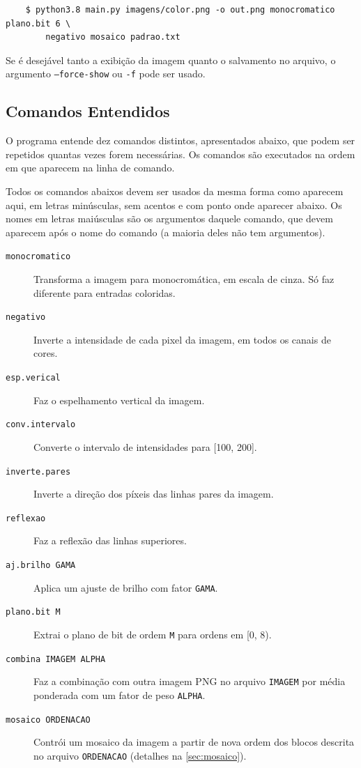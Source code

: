 \begin{verbatim}
    $ python3.8 main.py imagens/color.png -o out.png monocromatico plano.bit 6 \
        negativo mosaico padrao.txt
\end{verbatim}

Se é desejável tanto a exibição da imagem quanto o salvamento no arquivo, o argumento \texttt{--force-show} ou \texttt{-f} pode ser usado.

\subsection{Comandos Entendidos}

O programa entende dez comandos distintos, apresentados abaixo, que podem ser repetidos quantas vezes forem necessárias. Os comandos são executados na ordem em que aparecem na linha de comando.

Todos os comandos abaixos devem ser usados da mesma forma como aparecem aqui, em letras minúsculas, sem acentos e com ponto onde aparecer abaixo. Os nomes em letras maiúsculas são os argumentos daquele comando, que devem aparecem após o nome do comando (a maioria deles não tem argumentos).

\begin{description}
    \item[\texttt{monocromatico}] Transforma a imagem para monocromática, em escala de cinza. Só faz diferente para entradas coloridas.

    \item[\texttt{negativo}] Inverte a intensidade de cada pixel da imagem, em todos os canais de cores.

    \item[\texttt{esp.verical}] Faz o espelhamento vertical da imagem.

    \item[\texttt{conv.intervalo}] Converte o intervalo de intensidades para [100, 200].

    \item[\texttt{inverte.pares}] Inverte a direção dos píxeis das linhas pares da imagem.

    \item[\texttt{reflexao}] Faz a reflexão das linhas superiores.

    \item[\texttt{aj.brilho GAMA}] Aplica um ajuste de brilho com fator \texttt{GAMA}.

    \item[\texttt{plano.bit M}] Extrai o plano de bit de ordem \texttt{M} para ordens em [0, 8).

    \item[\texttt{combina IMAGEM ALPHA}] Faz a combinação com outra imagem PNG no arquivo \texttt{IMAGEM} por média ponderada com um fator de peso \texttt{ALPHA}.

    \item[\texttt{mosaico ORDENACAO}] Contrói um mosaico da imagem a partir de nova ordem dos blocos descrita no arquivo \texttt{ORDENACAO} (detalhes na \cref{sec:mosaico}).
\end{description}
